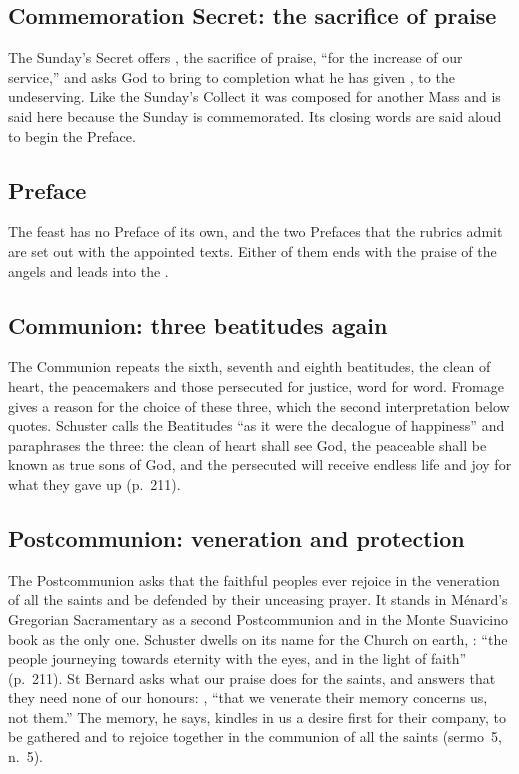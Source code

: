 \subsection{Commemoration Secret: the sacrifice of praise}
\label{sec:element-commemoration-secret}

The Sunday's Secret offers , the sacrifice
of praise, ``for the increase of our service,'' and asks God to bring to
completion what he has given , to the undeserving. Like the
Sunday's Collect it was composed for another Mass and is said here because the
Sunday is commemorated. Its closing words are said aloud to begin the Preface.

\subsection{Preface}
\label{sec:element-preface}

The feast has no Preface of its own, and the two Prefaces that the rubrics
admit are set out with the appointed texts. Either of them ends with the
praise of the angels and leads into the .

\subsection{Communion: three beatitudes again}
\label{sec:element-communion}

The Communion repeats the sixth, seventh and eighth beatitudes, the clean of
heart, the peacemakers and those persecuted for justice, word for word.
Fromage gives a reason for the choice of these three, which the second
interpretation below quotes. Schuster calls the Beatitudes ``as it were the
decalogue of happiness'' and paraphrases the three: the clean of heart shall
see God, the peaceable shall be known as true sons of God, and the persecuted
will receive endless life and joy for what they gave up (p.~211).

\subsection{Postcommunion: veneration and protection}
\label{sec:element-postcommunion}

The Postcommunion asks that the faithful peoples ever rejoice in the
veneration of all the saints and be defended by their unceasing prayer. It
stands in Ménard's Gregorian Sacramentary as a second Postcommunion and in the
Monte Suavicino book as the only one. Schuster dwells on its name for the
Church on earth, : ``the people journeying towards
eternity with the eyes, and in the light of faith'' (p.~211). St Bernard asks
what our praise does for the saints, and answers that they need none of our
honours: ,
``that we venerate their memory concerns us, not them.'' The memory, he says,
kindles in us a desire first for their company, to be gathered and to rejoice
together in the communion of all the saints (sermo~5, n.~5).

